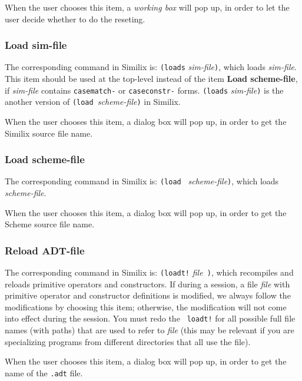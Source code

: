 \begin{sloppypar}
When the user chooses this item, a {\it working box} will pop up, in
order to let the user decide whether to do the reseting.



\subsubsection{Load sim-file}


The corresponding command in Similix is: {\tt (loads} {\it
sim-file}{\tt )}, which loads {\it sim-file}.  This item should be
used at the top-level instead of the item {\bf Load scheme-file}, if
{\it sim-file} contains {\tt casematch-} or {\tt caseconstr-}
forms. {\tt (loads} {\it sim-file}{\tt )} is the another version of
{\tt (load }{\it scheme-file}{\tt )} in Similix.

When the user chooses this item, a dialog box will pop up, in order to
get the Similix source file name.



\subsubsection{Load scheme-file}


The corresponding command in Similix is: {\tt (load }{\it
scheme-file}{\tt )}, which loads {\it scheme-file}.

   When the user chooses this item, a dialog box will pop up, in order
to get the Scheme source file name.



\subsubsection{Reload ADT-file}


The corresponding command in Similix is: {\tt (loadt!} {\it file}{\tt
)}, which recompiles and reloads primitive operators and
constructors. If during a session, a file {\it file} with primitive
operator and constructor definitions is modified, we always follow the
modifications by choosing this item; otherwise, the modification will
not come into effect during the session.  You must redo the {\tt
loadt!}  for all possible full file names (with paths) that are used
to refer to {\it file} (this may be relevant if you are specializing
programs from different directories that all use the file).

   When the user chooses this item, a dialog box will pop up, in order
to get the name of the {\tt .adt} file.




\end{sloppypar}
